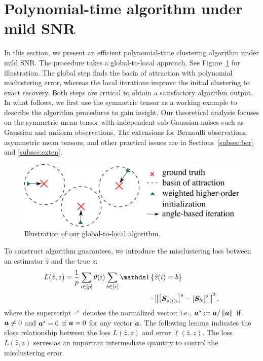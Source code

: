 \documentclass[journal]{IEEEtran}
\theoremstyle{definition}
\theoremstyle{definition}
\newcommand{\off}[1]{\left[#1\right]}
\newcommand{\offf}[1]{\left\{#1\right\}}
\begin{document}
\section{Polynomial-time algorithm under mild SNR}\label{sec:alg}
In this section, we present an efficient polynomial-time clustering algorithm under mild SNR. The procedure takes a global-to-local approach. See Figure~\ref{fig:demo} for illustration. The global step finds the basin of attraction with polynomial miclustering error, whereas the local iterations improve the initial clustering to exact recovery. Both steps are critical to obtain a satisfactory algorithm output. In what follows, we first use the symmetric tensor as a working example to describe the algorithm procedures to gain insight.    {Our theoretical analysis focuses on the symmetric mean tensor with independent sub-Gaussian noises} 
such as Gaussian and uniform observations.   {The extensions for Bernoulli observations, asymmetric mean tensors, and other practical issues are in Sections~\ref{subsec:ber} and \ref{subsec:exten}.}

\begin{figure}[ht!]
\centering
\includegraphics[width=\columnwidth]{alg_demo.pdf}
\caption{Illustration of our global-to-local algorithm.}\label{fig:demo}
\end{figure}

To construct algorithm guarantees,  we introduce the misclustering loss between an estimator $\hat z$ and the true $z$:
\begin{align}
     L(\hat z, z) = \frac{1}{p}  \sum_{i \in [p]} \theta(i) \sum_{b \in [r]}  \ind &\offf{ \hat z(i) = b } \\
     & \cdot \onorm{ \off{ \mS_{ z(i):}  }^s - \off{ \mS_{b:}  }^s  }^2, \label{eq:defnofL}
\end{align}
where the superscript $\cdot^{s}$ denotes the normalized vector; i.e., $\bm{a}^s:=\bm{a}/\left\lVert\bm{a}\right\rVert$ if $\bm{a}\neq 0$ and $\bm{a}^{s}=0$ if $\bm{a}=0$ for any vector $\bm{a}$. The following lemma indicates the close relationship between the loss $L(\hat z, z)$ and error $\ell(\hat z, z)$. The loss $L(\hat z, z)$ serves as an important intermediate quantity to control the misclustering error.
\end{document}

